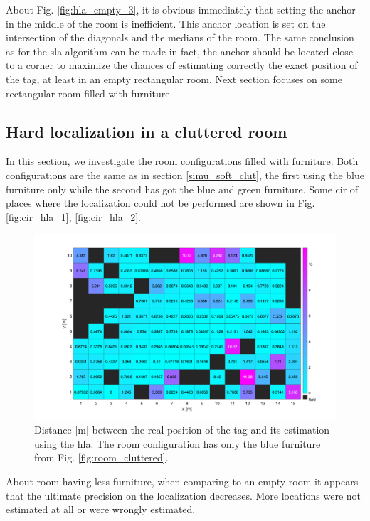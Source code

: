 About Fig. \ref{fig:hla_empty_3}, it is obvious immediately that setting the anchor in the middle of the room is inefficient. This anchor location is set on the intersection of the diagonals and the medians of the room. The same conclusion as for the \gls{sla} algorithm can be made in fact, the anchor should be located close to a corner to maximize the chances of estimating correctly the exact position of the tag, at least in an empty rectangular room. Next section focuses on some rectangular room filled with furniture.


\subsection{Hard localization in a cluttered room}

In this section, we investigate the room configurations filled with furniture. Both configurations are the same as in section \ref{simu_soft_clut}, the first using the blue furniture only while the second has got the blue and green furniture. Some \gls{cir} of places where the localization could not be performed are shown in Fig. \ref{fig:cir_hla_1}, \ref{fig:cir_hla_2}.

\begin{figure}[H]
\centering
\includegraphics[width=.9\linewidth]{Images/hla_images/anchor_clut_(3_1).png}
\caption{Distance [m] between the real position of the tag and its estimation using the \gls{hla}. The room configuration has only the blue furniture from Fig. \ref{fig:room_cluttered}.\label{fig:hla_little_clut}}
\end{figure}

About room having less furniture, when comparing to an empty room it appears that the ultimate precision on the localization decreases. More locations were not estimated at all or were wrongly estimated.

